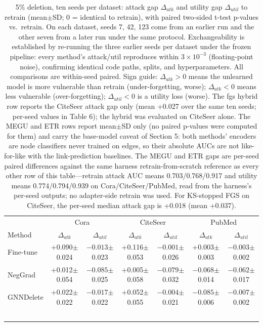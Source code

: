\documentclass[pdflatex,sn-basic,Numbered]{sn-jnl}
\begin{document}
\begin{table}[htbp]\centering\tiny\setlength{\tabcolsep}{2.5pt}
\caption{5\% deletion, ten seeds per dataset: attack gap $\Delta_{atk}$ and utility gap $\Delta_{util}$ to retrain (mean$\pm$SD; 0 = identical to retrain), with paired two-sided t-test p-values vs.\ retrain. On each dataset, seeds 7, 42, 123 come from an earlier run and the other seven from a later run under the same protocol. Exchangeability is established by re-running the three earlier seeds per dataset under the frozen pipeline: every method's attack/util reproduces within $3 \times 10^{-3}$ (floating-point noise), confirming identical code paths, splits, and hyperparameters. All comparisons are within-seed paired. Sign guide: $\Delta_{atk} > 0$ means the unlearned model is more vulnerable than retrain (under-forgetting, worse); $\Delta_{atk} < 0$ means less vulnerable (over-forgetting); $\Delta_{util} < 0$ is a utility loss (worse). The fgs hybrid row reports the CiteSeer attack gap only (mean +0.027 over the same ten seeds; per-seed values in Table 6); the hybrid was evaluated on CiteSeer alone. The MEGU and ETR rows report mean$\pm$SD only (no paired p-values were computed for them) and carry the base-model caveat of Section 5: both methods' encoders are node classifiers never trained on edges, so their absolute AUCs are not like-for-like with the link-prediction baselines. The MEGU and ETR gaps are per-seed paired differences against the same harness retrain-from-scratch reference as every other row of this table---retrain attack AUC means 0.703/0.768/0.917 and utility means 0.774/0.794/0.939 on Cora/CiteSeer/PubMed, read from the harness's per-seed outputs; no adapter-side retrain was used. For KS-stopped FGS on CiteSeer, the per-seed median attack gap is +0.018 (mean +0.037).}
\begin{tabular}{lcccccc}\toprule & \multicolumn{2}{c}{Cora} & \multicolumn{2}{c}{CiteSeer} & \multicolumn{2}{c}{PubMed}\\
Method & $\Delta_{atk}$ & $\Delta_{util}$ & $\Delta_{atk}$ & $\Delta_{util}$ & $\Delta_{atk}$ & $\Delta_{util}$\\\midrule
Fine-tune & +0.090$\pm$0.024 & $-0.013$$\pm$0.023 & +0.116$\pm$0.053 & $-0.001$$\pm$0.026 & +0.003$\pm$0.003 & $-0.003$$\pm$0.002\\
NegGrad & +0.012$\pm$0.054 & $-0.085$$\pm$0.025 & +0.005$\pm$0.058 & $-0.079$$\pm$0.032 & $-0.068$$\pm$0.014 & $-0.062$$\pm$0.017\\
GNNDelete & +0.022$\pm$0.022 & $-0.017$$\pm$0.022 & +0.052$\pm$0.055 & $-0.004$$\pm$0.021 & $-0.085$$\pm$0.006 & $-0.007$$\pm$0.002\\
$$
\end{tabular}
\end{table}
\end{document}
